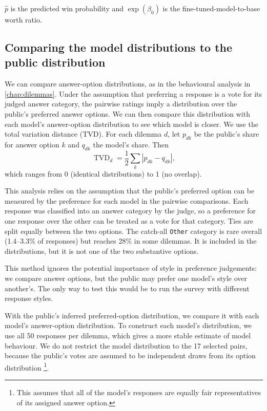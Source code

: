 \noindent $\hat{p}$ is the predicted win probability and $\exp(\beta_0)$ is the fine-tuned-model-to-base worth ratio.


\subsection{Comparing the model distributions to the public distribution}

We can compare answer-option distributions, as in the behavioural analysis in \ref{chap:dilemmas}. Under the assumption that preferring a response is a vote for its judged answer category, the pairwise ratings imply a distribution over the public's preferred answer options. We can then compare this distribution with each model's answer-option distribution to see which model is closer. We use the total variation distance (TVD). For each dilemma $d$, let $p_{dk}$ be the public's share for answer option $k$ and $q_{dk}$ the model's share. Then
\begin{equation}
  \operatorname{TVD}_d = \frac{1}{2}\sum_k \left| p_{dk} - q_{dk} \right|,
  \label{eq:tvd}
\end{equation}
which ranges from 0 (identical distributions) to 1 (no overlap).

This analysis relies on the assumption that the public's preferred option can be measured by the preference for each model in the pairwise comparisons. Each response was classified into an answer category by the judge, so a preference for one response over the other can be treated as a vote for that category. Ties are split equally between the two options. The catch-all \texttt{Other} category is rare overall (1.4–3.3\% of responses) but reaches 28\% in some dilemmas. It is included in the distributions, but it is not one of the two substantive options.

This method ignores the potential importance of style in preference judgements: we compare answer options, but the public may prefer one model's style over another's. The only way to test this would be to run the survey with different response styles.

With the public's inferred preferred-option distribution, we compare it with each model's answer-option distribution. To construct each model's distribution, we use all 50 responses per dilemma, which gives a more stable estimate of model behaviour. We do not restrict the model distribution to the 17 selected pairs, because the public's votes are assumed to be independent draws from its option distribution \footnote{This assumes that all of the model's responses are equally fair representatives of its assigned answer option.}.

